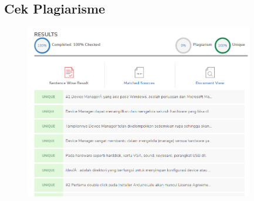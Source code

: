 \subsection{Cek Plagiarisme}
\begin{figure}[H]
		\includegraphics[width=10cm]{figures/5/1174071/Teori/plagiarisme.png}
		\centering
	\end{figure}
